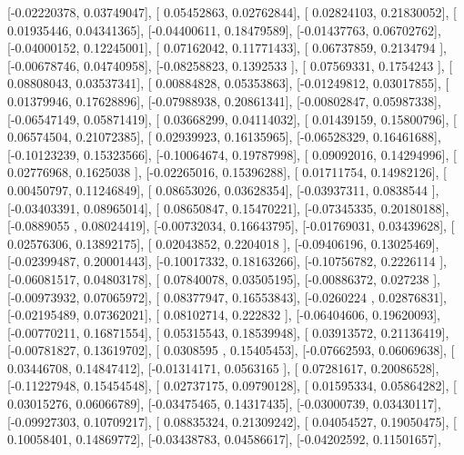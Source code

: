\documentclass{article}
\begin{document}
       [-0.02220378,  0.03749047],
       [ 0.05452863,  0.02762844],
       [ 0.02824103,  0.21830052],
       [ 0.01935446,  0.04341365],
       [-0.04400611,  0.18479589],
       [-0.01437763,  0.06702762],
       [-0.04000152,  0.12245001],
       [ 0.07162042,  0.11771433],
       [ 0.06737859,  0.2134794 ],
       [-0.00678746,  0.04740958],
       [-0.08258823,  0.1392533 ],
       [ 0.07569331,  0.1754243 ],
       [ 0.08808043,  0.03537341],
       [ 0.00884828,  0.05353863],
       [-0.01249812,  0.03017855],
       [ 0.01379946,  0.17628896],
       [-0.07988938,  0.20861341],
       [-0.00802847,  0.05987338],
       [-0.06547149,  0.05871419],
       [ 0.03668299,  0.04114032],
       [ 0.01439159,  0.15800796],
       [ 0.06574504,  0.21072385],
       [ 0.02939923,  0.16135965],
       [-0.06528329,  0.16461688],
       [-0.10123239,  0.15323566],
       [-0.10064674,  0.19787998],
       [ 0.09092016,  0.14294996],
       [ 0.02776968,  0.1625038 ],
       [-0.02265016,  0.15396288],
       [ 0.01711754,  0.14982126],
       [ 0.00450797,  0.11246849],
       [ 0.08653026,  0.03628354],
       [-0.03937311,  0.0838544 ],
       [-0.03403391,  0.08965014],
       [ 0.08650847,  0.15470221],
       [-0.07345335,  0.20180188],
       [-0.0889055 ,  0.08024419],
       [-0.00732034,  0.16643795],
       [-0.01769031,  0.03439628],
       [ 0.02576306,  0.13892175],
       [ 0.02043852,  0.2204018 ],
       [-0.09406196,  0.13025469],
       [-0.02399487,  0.20001443],
       [-0.10017332,  0.18163266],
       [-0.10756782,  0.2226114 ],
       [-0.06081517,  0.04803178],
       [ 0.07840078,  0.03505195],
       [-0.00886372,  0.027238  ],
       [-0.00973932,  0.07065972],
       [ 0.08377947,  0.16553843],
       [-0.0260224 ,  0.02876831],
       [-0.02195489,  0.07362021],
       [ 0.08102714,  0.222832  ],
       [-0.06404606,  0.19620093],
       [-0.00770211,  0.16871554],
       [ 0.05315543,  0.18539948],
       [ 0.03913572,  0.21136419],
       [-0.00781827,  0.13619702],
       [ 0.0308595 ,  0.15405453],
       [-0.07662593,  0.06069638],
       [ 0.03446708,  0.14847412],
       [-0.01314171,  0.0563165 ],
       [ 0.07281617,  0.20086528],
       [-0.11227948,  0.15454548],
       [ 0.02737175,  0.09790128],
       [ 0.01595334,  0.05864282],
       [ 0.03015276,  0.06066789],
       [-0.03475465,  0.14317435],
       [-0.03000739,  0.03430117],
       [-0.09927303,  0.10709217],
       [ 0.08835324,  0.21309242],
       [ 0.04054527,  0.19050475],
       [ 0.10058401,  0.14869772],
       [-0.03438783,  0.04586617],
       [-0.04202592,  0.11501657],
\end{document}
